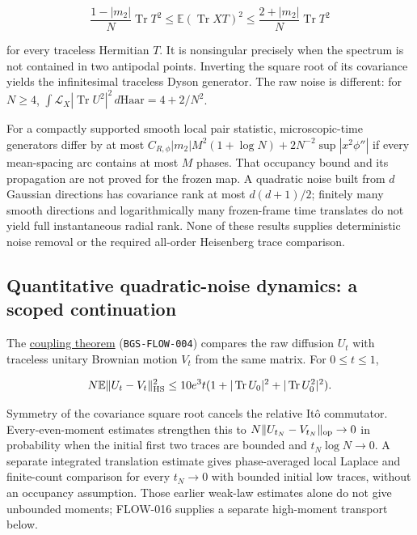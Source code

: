 \[
\frac{1-|m_2|}{N}\operatorname{Tr}T^2
\le\mathbb E(\operatorname{Tr}XT)^2
\le\frac{2+|m_2|}{N}\operatorname{Tr}T^2
\]

for every traceless Hermitian \(T\). It is nonsingular precisely when the
spectrum is not contained in two antipodal points. Inverting the square
root of its covariance yields the infinitesimal traceless Dyson generator.
The raw noise is different: for \(N\ge4\),
\(\int\mathcal L_X|\operatorname{Tr}U^2|^2\,d\mathrm{Haar}=4+2/N^2\).

For a compactly supported smooth local pair statistic, microscopic-time
generators differ by at most
\(C_{R,\phi}|m_2|M^2(1+\log N)+2N^{-2}\sup|x^2\phi''|\)
if every mean-spacing arc contains at most \(M\) phases. That occupancy
bound and its propagation are not proved for the frozen map. A quadratic
noise built from \(d\) Gaussian directions has covariance rank at most
\(d(d+1)/2\); finitely many smooth directions and logarithmically many
frozen-frame time translates do not yield full instantaneous radial rank.
None of these results supplies deterministic noise removal or the required
all-order Heisenberg trace comparison.

\hypertarget{quantitative-quadratic-noise-dynamics-a-scoped-continuation}{%
\subsection{Quantitative quadratic-noise dynamics: a scoped continuation}\label{quantitative-quadratic-noise-dynamics-a-scoped-continuation}}

The \href{https://github.com/ChurilovMaksim/BGS/blob/main/mathematics/quadratic_noise_coupling.md}{coupling theorem} (\texttt{BGS-FLOW-004})
compares the raw diffusion \(U_t\) with traceless unitary Brownian motion
\(V_t\) from the same matrix. For \(0\le t\le1\),

\[
N\mathbb E\|U_t-V_t\|_{\rm HS}^2
\le10e^3t(1+|\operatorname{Tr}U_0|^2+|\operatorname{Tr}U_0^2|^2).
\]

Symmetry of the covariance square root cancels the relative Itô
commutator. Every-even-moment estimates strengthen this to
\(N\|U_{t_N}-V_{t_N}\|_{\rm op}\to0\) in probability when the initial
first two traces are bounded and \(t_N\log N\to0\). A separate integrated
translation estimate gives phase-averaged local Laplace and finite-count
comparison for every \(t_N\to0\) with bounded initial low traces, without
an occupancy assumption. Those earlier weak-law estimates alone do not give
unbounded moments; FLOW-016 supplies a separate high-moment transport below.

